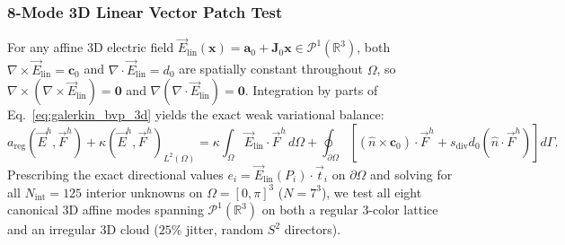 \documentclass[preprint,12pt]{elsarticle}
\newcommand{\curl}{\nabla \times}
\newcommand{\divg}{\nabla \cdot}
\newcommand{\grad}{\nabla}
\newcommand{\R}{\mathbb{R}}
\begin{document}
\subsubsection{8-Mode 3D Linear Vector Patch Test}
\label{subsubsec:patch_test_3d}

For any affine 3D electric field $\vec{E}_{\text{lin}}(\mathbf{x}) = \mathbf{a}_0 + \mathbf{J}_0 \mathbf{x} \in \mathcal{P}^1(\R^3)$, both $\curl\vec{E}_{\text{lin}} = \mathbf{c}_0$ and $\divg\vec{E}_{\text{lin}} = d_0$ are spatially constant throughout $\Omega$, so $\curl(\curl\vec{E}_{\text{lin}}) = \mathbf{0}$ and $\grad(\divg\vec{E}_{\text{lin}}) = \mathbf{0}$. Integration by parts of Eq.~\eqref{eq:galerkin_bvp_3d} yields the exact weak variational balance:
\begin{equation}
    a_{\text{reg}}(\vec{E}^h, \vec{F}^h) + \kappa(\vec{E}^h, \vec{F}^h)_{L^2(\Omega)} = \kappa \int_\Omega \vec{E}_{\text{lin}}\cdot\vec{F}^h\,d\Omega + \oint_{\partial\Omega} \left[ (\hat{n}\times\mathbf{c}_0)\cdot\vec{F}^h + s_{\text{div}} d_0 (\hat{n}\cdot\vec{F}^h) \right] d\Gamma.
    \label{eq:patch_test_weak_3d}
\end{equation}
Prescribing the exact directional values $e_i = \vec{E}_{\text{lin}}(P_i)\cdot\vec{t}_i$ on $\partial\Omega$ and solving for all $N_{\text{int}} = 125$ interior unknowns on $\Omega = [0,\pi]^3$ ($N=7^3$), we test all eight canonical 3D affine modes spanning $\mathcal{P}^1(\R^3)$ on both a regular 3-color lattice and an irregular 3D cloud ($25\%$ jitter, random $S^2$ directors).
\end{document}
